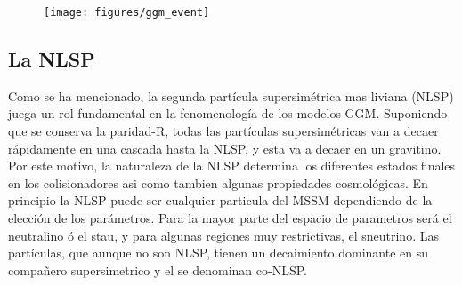 \begin{figure}[!htbp]
  \centering
  \texttt{[image: figures/ggm\_event]}
  \caption{}
  \label{fig:ggm_event}
\end{figure}








\subsection{La NLSP}

Como se ha mencionado, la segunda partícula supersimétrica mas liviana (NLSP) juega un rol fundamental
en la fenomenología de los modelos GGM. Suponiendo que se conserva la paridad-R,
todas las partículas supersimétricas van a decaer rápidamente en una cascada
hasta la NLSP, y esta va a decaer en un gravitino. Por este motivo, la
naturaleza de la NLSP determina los diferentes estados finales en los
colisionadores asi como tambien algunas propiedades cosmológicas. En principio
la NLSP puede ser cualquier particula del MSSM dependiendo de la elección de los
parámetros. Para la mayor parte del espacio de parametros será el neutralino ó
el stau, y para algunas regiones muy restrictivas, el
sneutrino\cite{arxiv:9801271}.
Las partículas, que aunque no son NLSP, tienen un decaimiento dominante en su
compañero supersimetrico y el {\gravino} se denominan co-NLSP.

